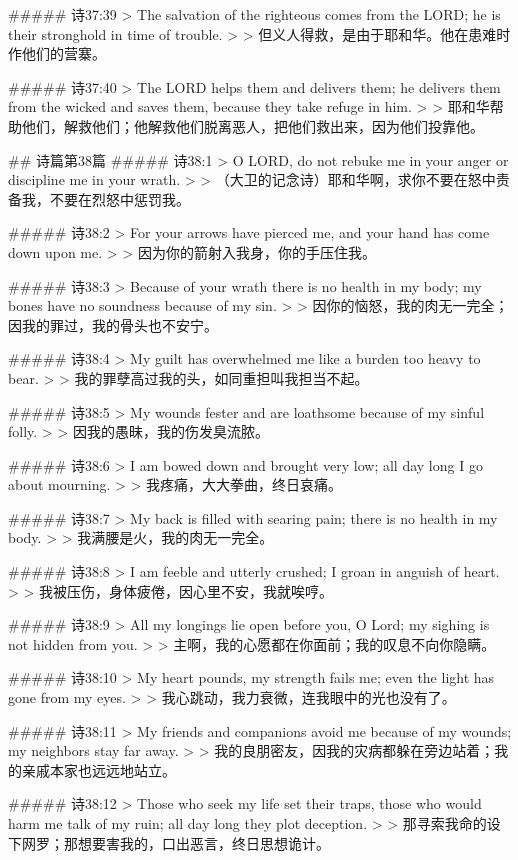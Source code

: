 ##### 诗37:39
> The salvation of the righteous comes from the LORD; he is their stronghold in time of trouble.
>
> 但义人得救，是由于耶和华。他在患难时作他们的营寨。


##### 诗37:40
> The LORD helps them and delivers them; he delivers them from the wicked and saves them, because they take refuge in him.
>
> 耶和华帮助他们，解救他们；他解救他们脱离恶人，把他们救出来，因为他们投靠他。


## 诗篇第38篇
##### 诗38:1
> O LORD, do not rebuke me in your anger or discipline me in your wrath.
>
> （大卫的记念诗）耶和华啊，求你不要在怒中责备我，不要在烈怒中惩罚我。


##### 诗38:2
> For your arrows have pierced me, and your hand has come down upon me.
>
> 因为你的箭射入我身，你的手压住我。


##### 诗38:3
> Because of your wrath there is no health in my body; my bones have no soundness because of my sin.
>
> 因你的恼怒，我的肉无一完全；因我的罪过，我的骨头也不安宁。


##### 诗38:4
> My guilt has overwhelmed me like a burden too heavy to bear.
>
> 我的罪孽高过我的头，如同重担叫我担当不起。


##### 诗38:5
> My wounds fester and are loathsome because of my sinful folly.
>
> 因我的愚昧，我的伤发臭流脓。


##### 诗38:6
> I am bowed down and brought very low; all day long I go about mourning.
>
> 我疼痛，大大拳曲，终日哀痛。


##### 诗38:7
> My back is filled with searing pain; there is no health in my body.
>
> 我满腰是火，我的肉无一完全。


##### 诗38:8
> I am feeble and utterly crushed; I groan in anguish of heart.
>
> 我被压伤，身体疲倦，因心里不安，我就唉哼。


##### 诗38:9
> All my longings lie open before you, O Lord; my sighing is not hidden from you.
>
> 主啊，我的心愿都在你面前；我的叹息不向你隐瞒。


##### 诗38:10
> My heart pounds, my strength fails me; even the light has gone from my eyes.
>
> 我心跳动，我力衰微，连我眼中的光也没有了。


##### 诗38:11
> My friends and companions avoid me because of my wounds; my neighbors stay far away.
>
> 我的良朋密友，因我的灾病都躲在旁边站着；我的亲戚本家也远远地站立。


##### 诗38:12
> Those who seek my life set their traps, those who would harm me talk of my ruin; all day long they plot deception.
>
> 那寻索我命的设下网罗；那想要害我的，口出恶言，终日思想诡计。


